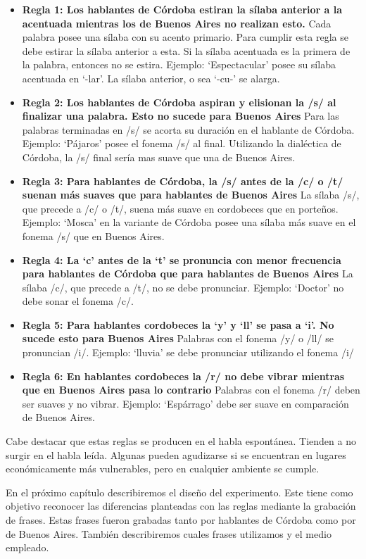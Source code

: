 \begin{itemize}

\item \textbf{Regla 1: Los hablantes de Córdoba estiran la sílaba anterior a la acentuada mientras los de Buenos Aires no realizan esto.} Cada palabra posee una sílaba con su acento primario. Para cumplir esta regla se debe estirar la sílaba anterior a esta. Si la sílaba acentuada es la primera de la palabra, entonces no se estira. Ejemplo: `Espectacular' posee su sílaba acentuada en `-lar'. La sílaba anterior, o sea `-cu-' se alarga. 

\item \textbf{Regla 2: Los hablantes de Córdoba aspiran y elisionan la /s/ al finalizar una palabra. Esto no sucede para Buenos Aires} Para las palabras terminadas en /s/ se acorta su duración en el hablante de Córdoba. Ejemplo: `Pájaros' posee el fonema /s/ al final. Utilizando la dialéctica de Córdoba, la /s/ final sería mas suave que una de Buenos Aires. 

\item \textbf{Regla 3: Para hablantes de Córdoba, la /s/ antes de la /c/ o /t/ suenan más suaves que para hablantes de Buenos Aires } La sílaba /s/, que precede a /c/ o /t/, suena más suave en cordobeces que en porteños. Ejemplo: `Mosca' en la variante de Córdoba posee una sílaba más suave en el fonema /s/ que en Buenos Aires. 

\item \textbf{Regla 4: La `c' antes de la `t' se pronuncia con menor frecuencia para hablantes de Córdoba que para hablantes de Buenos Aires} La sílaba /c/, que precede a /t/, no se debe pronunciar. Ejemplo: `Doctor' no debe sonar el fonema /c/.

\item \textbf{Regla 5: Para hablantes cordobeces la `y’ y `ll’ se pasa a `i’. No sucede esto para Buenos Aires} Palabras con el fonema /y/ o /ll/ se pronuncian /i/. Ejemplo: `lluvia' se debe pronunciar utilizando el fonema /i/ 

\item \textbf{Regla 6: En hablantes cordobeces la /r/ no debe vibrar mientras que en Buenos Aires pasa lo contrario} Palabras con el fonema /r/ deben ser suaves y no vibrar. Ejemplo: `Espárrago' debe ser suave en comparación de Buenos Aires. 

\end{itemize}

Cabe destacar que estas reglas se producen en el habla espontánea. Tienden a no surgir en el habla leída. Algunas pueden agudizarse si se encuentran en lugares económicamente más vulnerables, pero en cualquier ambiente se cumple.

En el próximo capítulo describiremos el diseño del experimento. Este tiene como objetivo reconocer las diferencias planteadas con las reglas mediante la grabación de frases. Estas frases fueron grabadas tanto por hablantes de Córdoba como por de Buenos Aires. También describiremos cuales frases utilizamos y el medio empleado.
